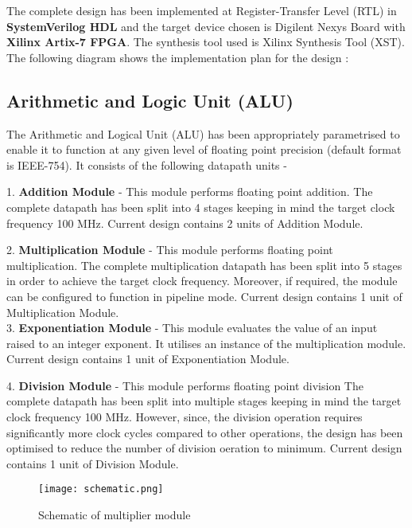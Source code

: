The complete design has been implemented at Register-Transfer Level (RTL) in {\bf SystemVerilog HDL} and the target device chosen is Digilent Nexys Board with {\bf Xilinx Artix-7 FPGA}. The synthesis tool used is Xilinx Synthesis Tool (XST). The following diagram shows the implementation plan for the design :



\subsection{Arithmetic and Logic Unit (ALU)}
The Arithmetic and Logical Unit (ALU) has been appropriately parametrised to enable it to function at any given level of floating point precision (default format is IEEE-754). It consists of the following datapath units -

1. {\bf Addition Module} - This module performs floating point addition. The complete datapath has been split into 4 stages keeping in mind the target clock frequency 100 MHz. Current design contains 2 units of Addition Module.

2. {\bf Multiplication Module} - This module performs floating point multiplication. The complete multiplication datapath has been split into 5 stages in order to achieve the target clock frequency. Moreover, if required, the module can be configured to function in pipeline mode. Current design contains 1 unit of Multiplication Module.
\\

3. {\bf Exponentiation Module} - This module evaluates the value of an input raised to an integer exponent. It utilises an instance of the multiplication module. Current design contains 1 unit of Exponentiation Module.

4. {\bf Division Module} - This module performs floating point division The complete datapath has been split into multiple stages keeping in mind the target clock frequency 100 MHz. However, since, the division operation requires significantly more clock cycles compared to other operations, the design has been optimised to reduce the number of division oeration to minimum. Current design contains 1 unit of Division Module.

\begin{figure}[H]
\centering
\texttt{[image: schematic.png]}
\caption{Schematic of multiplier module}\label{fig:schematic}
\end{figure}

